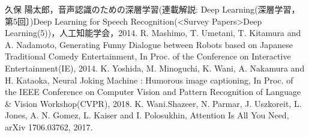\documentclass[10pt,a4j]{jsarticle}
\begin{document}
\begin{thebibliography}{3}

\bibitem{}久保 陽太郎，音声認識のための深層学習(連載解説: Deep Learning(深層学習，第5回〕)Deep Learning for Speech Recognition(<Survey Papers>Deep Learning(5))，人工知能学会，2014.
\bibitem{}R. Mashimo, T. Umetani, T. Kitamura and A. Nadamoto, Generating Funny Dialogue between Robots based on Japanese Traditional Comedy Entertainment, In Proc. of the Conference on Interactive Entertainment(IE), 2014.
\bibitem{}K. Yoshida, M. Minoguchi, K. Wani, A. Nakamura and H. Kataoka, Neural Joking Machine : Humorous image captioning, In Proc. of the IEEE Conference on Computer Vision and Pattern Recognition of Language \& Vision Workshop(CVPR), 2018.
\bibitem{}K. Wani.Shazeer, N. Parmar, J. Uszkoreit, L. Jones, A. N. Gomez, L. Kaiser and I. Polosukhin, Attention Is All You Need, arXiv 1706.03762, 2017.
\end{thebibliography}
\end{document}
